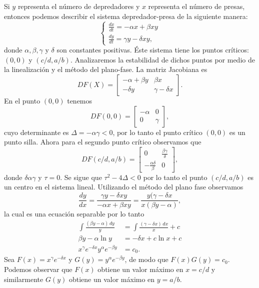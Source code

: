 \documentclass[11pt,letterpaper,draft]{report}
\newcommand\<{\langle}
\renewcommand\>{\rangle}
\begin{document}
Si $y$ representa el número de depredadores y $x$ representa el número de presas, entonces podemos describir el sistema depredador-presa de la siguiente manera:
\[
  \begin{cases}
    \frac{dx}{dt} = -\alpha x + \beta xy\\
    \frac{dy}{dt} = \gamma y - \delta xy,
  \end{cases}
\] donde $\alpha, \beta, \gamma$ y $\delta$ son constantes positivas. Éste sistema tiene los puntos críticos: $(0,0)$ y $(c / d, a / b)$. Analizaremos la estabilidad de dichos puntos por medio de la linealización y el método del plano-fase. La matriz Jacobiana es
\[
  DF(X) = \begin{bmatrix}
    -\alpha + \beta y & \beta x\\
    -\delta y & \gamma - \delta x
  \end{bmatrix}.
\] En el punto $(0,0)$ tenemos
\[
  DF(0,0) = \begin{bmatrix}
    -\alpha & 0\\
    0 & \gamma
  \end{bmatrix},
\] cuyo determinante es $\Delta = -\alpha \gamma < 0$, por lo tanto el punto crítico $(0,0)$ es un punto silla. Ahora para el segundo punto crítico observamos que
\[
  DF(c / d, a / b) = \begin{bmatrix}
    0 & \frac{\beta \gamma}{\delta}\\
    -\frac{\alpha \delta}{\beta} & 0
  \end{bmatrix},
\] donde $\delta \alpha \gamma$ y $\tau = 0$. Se sigue que $\tau^2 - 4\Delta < 0$ por lo tanto el punto $(c / d, a / b)$ es un centro en el sistema lineal. Utilizando el método del plano fase observamos
\[
  \frac{dy}{dx} = \frac{\gamma y - \delta x y}{-\alpha x + \beta x y} = \frac{y(\gamma - \delta x}{x(\beta y - \alpha)},
\] la cual es una ecuación separable por lo tanto
\begin{align*}
  \int \frac{(\beta y - \alpha) \, dy}{y} &= \int \frac{(\gamma - \delta x) \, dx}{x} + c\\
  \beta y - \alpha \ln y &= -\delta x + c \ln x + c\\
  x^{\gamma}e^{-\delta x}y^{\alpha}e^{-\beta y} &= c_0.
\end{align*} Sea $F(x) = x^{\gamma}e^{-\delta x}$ y $G(y) = y^{\alpha}e^{-\beta y}$, de modo que $F(x)G(y) = c_0$. Podemos observar que $F(x)$ obtiene un valor máximo en $x = c / d$ y similarmente $G(y)$ obtiene un valor máximo en $y = a / b$.
\end{document}
